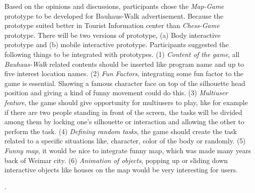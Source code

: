 Based on the opinions and discussions, participants chose the \emph{Map-Game} prototype to be developed for Bauhaus-Walk advertisement. Because the prototype suited better in Tourist Information center than \emph{Chess-Game} prototype. There will be two versions of prototype, (a) Body interactive prototype and (b) mobile interactive prototype. Participants suggested the following things to be integrated with prototypes. (1) \emph{Content of the game}, all \emph{Bauhaus-Walk} related contents should be inserted like program name and up to five interest location names. (2) \emph{Fun Factors}, integrating some fun factor to the game is essential. Showing a famous character face on top of the silhouette head position and giving a kind of funny movement could do this. (3) \emph{Multiuser feature}, the game should give opportunity for multiusers to play, like for example if there are two people standing in front of the screen, the tasks will be divided among them by locking one's silhouette or interaction and allowing the other to perform the task. (4) \emph{Defining random tasks}, the game should create the task related to a specific situations like, character, color of the body or randomly. (5) \emph{Funny map}, it would be nice to integrate funny map, which was made many years back of Weimar city. (6) \emph{Animation of objects}, popping up or sliding down interactive objects like houses on the map would be very interesting for users.


\newpage
.


